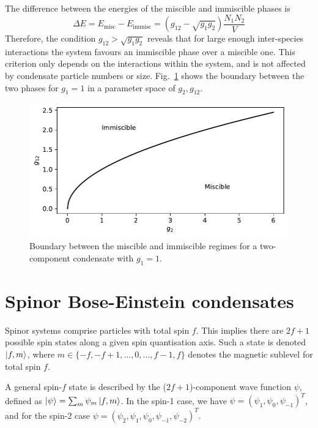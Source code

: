 The difference between the energies of the miscible and immiscible phases
is
\begin{equation}
    \Delta E = E_\mathrm{misc} - E_\mathrm{immisc} = (g_{12} - \sqrt{g_1g_2})
    \frac{N_1N_2}{V}
\end{equation}
Therefore, the condition \(g_{12} > \sqrt{g_1g_2}\) reveals that for large
enough inter-species interactions the system favours an immiscible phase
over a miscible one.
This criterion only depends on the interactions within the system, and is not
affected by condensate particle numbers or size.
Fig.~\ref{fig: miscible-vs-immiscible} shows the boundary between the two
phases for \(g_1=1\) in a parameter space of \(g_2, g_{12}\).
\begin{figure}
    \centering
    \includegraphics{gfx/ch-theory/miscible_vs_immiscible.pdf}
    \caption[Two-component miscible vs immiscible boundary]
    {\label{fig: miscible-vs-immiscible}Boundary between the miscible
        and immiscible regimes for a two-component condensate with \(g_1=1\).}
\end{figure}


\section{Spinor Bose-Einstein condensates}
Spinor systems comprise particles with total spin \(f\).
This implies there are \(2f + 1\) possible spin states along a given spin
quantisation axis.
Such a state is denoted \(\ket{f, m} \), where
\(m \in \{-f, -f+1, \ldots, 0, \ldots, f - 1, f\} \) denotes the magnetic
sublevel for total spin \( f\).

A general spin-\(f\) state is described by the (\(2f+1\))-component wave
function \(\psi \), defined as \(\ket{\psi} = \sum_m\psi_m\ket{f, m}\).
In the spin-1 case, we have \(\psi = {(\psi_1, \psi_0, \psi_{-1})}^T\), and for
the spin-2 case \(\psi = {(\psi_2, \psi_1, \psi_0, \psi_{-1}, \psi_{-2})}^T\).

